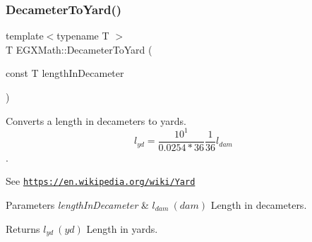 \subsubsection{\texorpdfstring{Decameter\+To\+Yard()}{DecameterToYard()}}
{\footnotesize\ttfamily template$<$typename T $>$ \\
T E\+G\+X\+Math\+::\+Decameter\+To\+Yard (\begin{DoxyParamCaption}\item[{const T}]{length\+In\+Decameter }\end{DoxyParamCaption})}



Converts a length in decameters to yards. \[ l_{yd}= \frac{10^{1}}{0.0254 * 36} \frac{1}{36} l_{dam} \]. 

See \href{https://en.wikipedia.org/wiki/Yard}{\tt https\+://en.\+wikipedia.\+org/wiki/\+Yard} 
\begin{DoxyParams}{Parameters}
{\em length\+In\+Decameter} & $ l_{dam}\ (dam)$ Length in decameters. \\
\hline
\end{DoxyParams}
\begin{DoxyReturn}{Returns}
$ l_{yd}\ (yd)$ Length in yards. 
\end{DoxyReturn}
